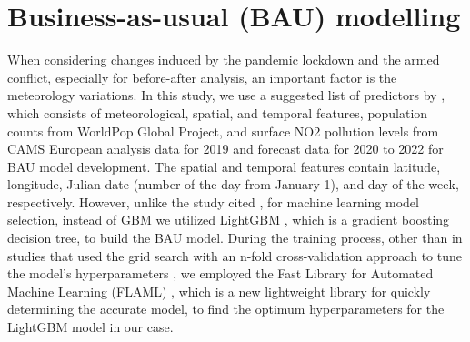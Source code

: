 \section{Business-as-usual (BAU) modelling} \label{chap3_bau}
When considering changes induced by the pandemic lockdown and the armed conflict, especially for before-after analysis, an important factor is the meteorology variations. In this study, we use a suggested list of predictors by \citep{barre2021estimating}, which consists of meteorological, spatial, and temporal features, population counts from WorldPop Global Project, and surface NO2 pollution levels from CAMS European analysis data for 2019 and forecast data for 2020 to 2022 for BAU model development. The spatial and temporal features contain latitude, longitude, Julian date (number of the day from January 1), and day of the week, respectively. However, unlike the study cited \citep{barre2021estimating}, for machine learning model selection, instead of GBM we utilized LightGBM \citep{ke2017lightgbm}, which is a gradient boosting decision tree, to build the BAU model. During the training process, other than in studies that used the grid search with an n-fold cross-validation approach to tune the model’s hyperparameters \citep{barre2021estimating,petetin2020meteorology}, we employed the Fast Library for Automated Machine Learning (FLAML) \citep{wang2021flaml}, which is a new lightweight library for quickly determining the accurate model, to find the optimum hyperparameters for the LightGBM model in our case. \par
